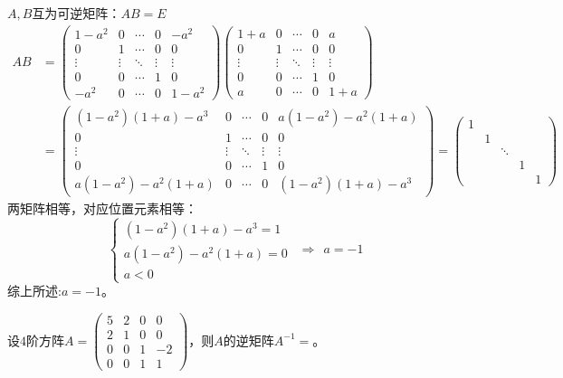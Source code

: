 \documentclass[a4paper]{report}
\begin{document}
\begin{jie}
$A,B$互为可逆矩阵：$AB=E$
\begin{align*}
AB&=
\begin{pmatrix}
1-a^2&0&\cdots&0&-a^2\\
0&1&\cdots&0&0\\
\vdots&\vdots&\ddots&\vdots&\vdots\\
0&0&\cdots&1&0\\
-a^2&0&\cdots&0&1-a^2
\end{pmatrix}
\begin{pmatrix}
1+a&0&\cdots&0&a\\
0&1&\cdots&0&0\\
\vdots&\vdots&\ddots&\vdots&\vdots\\
0&0&\cdots&1&0\\
a&0&\cdots&0&1+a
\end{pmatrix}\\ &=
\begin{pmatrix}
(1-a^2)(1+a)-a^3&0&\cdots&0&a(1-a^2)-a^{2}(1+a)\\
0&1&\cdots&0&0\\
\vdots&\vdots&\ddots&\vdots&\vdots\\
0&0&\cdots&1&0\\
a(1-a^2)-a^{2}(1+a)&0&\cdots&0&(1-a^2)(1+a)-a^3
\end{pmatrix}=
\begin{pmatrix}
1&&&&\\
&1&&&\\
&&\ddots&&\\
&&&1&\\
&&&&1
\end{pmatrix}
\end{align*}
两矩阵相等，对应位置元素相等：
\begin{equation*}
\begin{cases}
(1-a^2)(1+a)-a^3=1\\
a(1-a^2)-a^{2}(1+a)=0\\
a<0
\end{cases}~~\Rightarrow~~a=-1
\end{equation*}
综上所述:$a=-1$。
\end{jie}

\EX 设$4$阶方阵$
A=
\begin{pmatrix}
5&2&0&0\\
2&1&0&0\\
0&0&1&-2\\
0&0&1&1
\end{pmatrix}
$，则$A$的逆矩阵$A^{-1}=$\underline{\hphantom{~~~~~~~~~~~}}。
\end{document}
